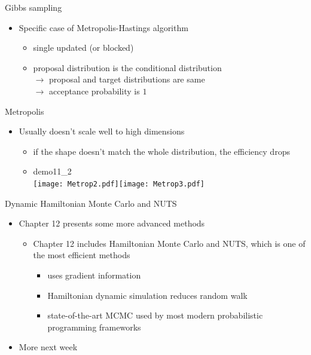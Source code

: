 \documentclass[finnish,english,t]{beamer}
\begin{document}

\begin{frame}{Gibbs sampling}

  \begin{itemize}
  \item Specific case of Metropolis-Hastings algorithm
    \begin{itemize}
    \item single updated (or blocked)
    \item proposal distribution is the conditional distribution\\
      $\rightarrow$ proposal and target distributions are same\\
      $\rightarrow$ acceptance probability is $1$
    \end{itemize}
  \end{itemize}  

\end{frame}

\begin{frame}{Metropolis}

  \begin{itemize}
  \item Usually doesn't scale well to high dimensions
    \begin{itemize}
    \item if the shape doesn't match the whole distribution, the efficiency drops
    \item demo11\_2\\
      \vspace{1\baselineskip}
      \hspace{-1cm}\texttt{[image: Metrop2.pdf]}\texttt{[image: Metrop3.pdf]}
    \end{itemize}
  \end{itemize}  

\end{frame}


\begin{frame}{Dynamic Hamiltonian Monte Carlo and NUTS}

  \begin{itemize}
  \item Chapter 12 presents some more advanced methods
    \begin{itemize}
    \item Chapter 12 includes Hamiltonian Monte Carlo and NUTS, which
      is one of the most efficient methods
      \begin{itemize}
      \item uses gradient information
      \item Hamiltonian dynamic simulation reduces random walk
      \item state-of-the-art MCMC used by most modern probabilistic
        programming frameworks
      \end{itemize}
    \end{itemize}
  \item More next week
  \end{itemize}  

\end{frame}
\end{document}
